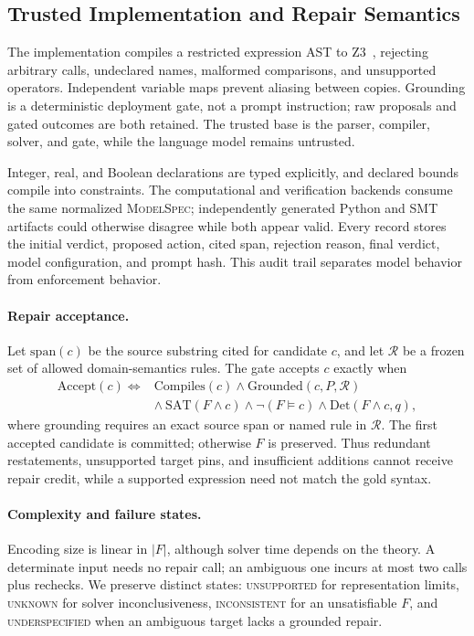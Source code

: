 \documentclass[sigconf,anonymous]{aamas}
\begin{document}
\subsection{Trusted Implementation and Repair Semantics}
The implementation compiles a restricted expression AST to Z3~\cite{demoura2008z3}, rejecting arbitrary calls, undeclared names, malformed comparisons, and unsupported operators.  Independent variable maps prevent aliasing between copies.  Grounding is a deterministic deployment gate, not a prompt instruction; raw proposals and gated outcomes are both retained.  The trusted base is the parser, compiler, solver, and gate, while the language model remains untrusted.

Integer, real, and Boolean declarations are typed explicitly, and declared bounds compile into constraints.  The computational and verification backends consume the same normalized \textsc{ModelSpec}; independently generated Python and SMT artifacts could otherwise disagree while both appear valid.  Every record stores the initial verdict, proposed action, cited span, rejection reason, final verdict, model configuration, and prompt hash.  This audit trail separates model behavior from enforcement behavior.

\paragraph{Repair acceptance.}
Let $\mathrm{span}(c)$ be the source substring cited for candidate $c$, and let $\mathcal{R}$ be a frozen set of allowed domain-semantics rules.  The gate accepts $c$ exactly when
\begin{align}
\mathrm{Accept}(c) \iff{}& \mathrm{Compiles}(c) \land
  \mathrm{Grounded}(c,P,\mathcal{R}) \nonumber\\
&\land\ \mathrm{SAT}(F\land c) \land \neg(F\models c)
  \land \mathrm{Det}(F\land c,q),
\label{eq:accept}
\end{align}
where grounding requires an exact source span or named rule in $\mathcal{R}$.  The first accepted candidate is committed; otherwise $F$ is preserved.  Thus redundant restatements, unsupported target pins, and insufficient additions cannot receive repair credit, while a supported expression need not match the gold syntax.

\paragraph{Complexity and failure states.}
Encoding size is linear in $|F|$, although solver time depends on the theory.  A determinate input needs no repair call; an ambiguous one incurs at most two calls plus rechecks.  We preserve distinct states: \textsc{unsupported} for representation limits, \textsc{unknown} for solver inconclusiveness, \textsc{inconsistent} for an unsatisfiable $F$, and \textsc{underspecified} when an ambiguous target lacks a grounded repair.
\end{document}
